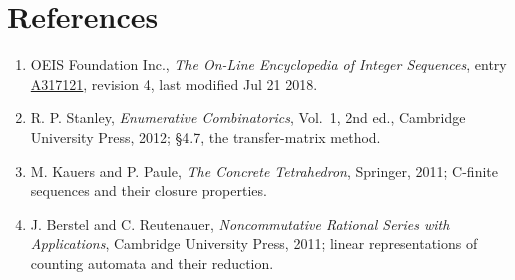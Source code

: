 \documentclass[11pt]{article}
\theoremstyle{definition}
\begin{document}
\section{References}

\begin{enumerate}

\item OEIS Foundation Inc., \emph{The On-Line Encyclopedia of Integer Sequences}, entry \href{https://oeis.org/A317121}{A317121}, revision 4, last modified Jul 21 2018.

\item R. P. Stanley, \emph{Enumerative Combinatorics}, Vol.~1, 2nd ed., Cambridge University Press, 2012; \S4.7, the transfer-matrix method.

\item M. Kauers and P. Paule, \emph{The Concrete Tetrahedron}, Springer, 2011; C-finite sequences and their closure properties.

\item J. Berstel and C. Reutenauer, \emph{Noncommutative Rational Series with Applications}, Cambridge University Press, 2011; linear representations of counting automata and their reduction.

\end{enumerate}
\end{document}
